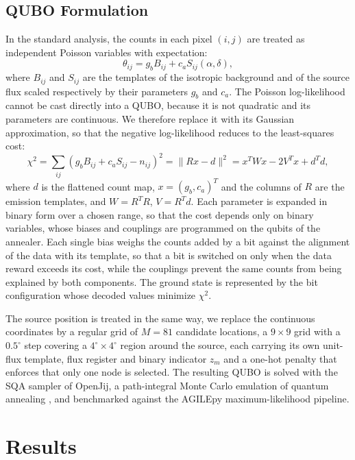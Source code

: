 \documentclass[11pt,twoside]{article}
\begin{document}
\subsection{QUBO Formulation}
In the standard analysis, the counts in each pixel $(i, j)$ are treated as independent Poisson variables with expectation:
\begin{equation}
    \theta_{ij} = g_b B_{ij} + c_a S_{ij}(\alpha, \delta),
    \label{eq:model}
\end{equation}
where $B_{ij}$ and $S_{ij}$ are the templates of the isotropic background and of the source flux scaled respectively by their parameters $g_b$ and $c_a$.
The Poisson log-likelihood cannot be cast directly into a QUBO, because it is not quadratic and its parameters are continuous. We therefore replace it with its Gaussian approximation, so that the negative log-likelihood reduces to the least-squares cost:
\begin{equation}
    \chi^{2} = \sum_{ij}\left(g_{b} B_{ij} + c_{a} S_{ij} - n_{ij}\right)^{2} = \lVert Rx - d \rVert^{2} = x^TWx - 2V^Tx + d^Td,
    \label{eq:cost}
\end{equation}
where $d$ is the flattened count map, $x = (g_b, c_a)^T$ and the columns of $R$ are the emission templates, and $W = R^TR$, $V = R^Td$. Each parameter is expanded in binary form over a chosen range, so that the cost depends only on binary variables, whose biases and couplings are programmed on the qubits of the annealer. Each single bias weighs the counts added by a bit against the alignment of the data with its template, so that a bit is switched on only when the data reward exceeds its cost, while the couplings prevent the same counts from being explained by both components. The ground state is represented by the bit configuration whose decoded values minimize $\chi^2$.

The source position is treated in the same way, we replace the continuous coordinates by a regular grid of $M = 81$ candidate locations, a $9 \times 9$ grid with a $0.5^\circ$ step covering a $4^\circ \times 4^\circ$ region around the source, each carrying its own unit-flux template, flux register and binary indicator $z_m$ and a one-hot penalty that enforces that only one node is selected.
The resulting QUBO is solved with the SQA sampler of OpenJij, a path-integral Monte Carlo emulation of quantum annealing \citep{openjij}, and benchmarked against the AGILEpy maximum-likelihood pipeline.


\section{Results}
\end{document}
